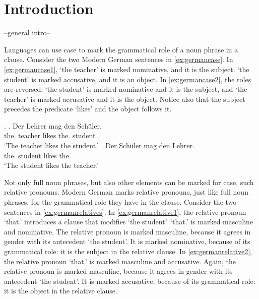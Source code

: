 
\chapter{Introduction}

--general intro--

Languages can use case to mark the grammatical role of a noun phrase in a clause. Consider the two Modern German sentences in \ref{ex:germancase}. In \ref{ex:germancase1},  `the teacher' is marked nominative, and it is the subject.  `the student' is marked accusative, and it is an object. In \ref{ex:germancase2}, the roles are reversed:  `the student' is marked nominative and it is the subject, and  `the teacher' is marked accusative and it is the object. Notice also that the subject precedes the predicate  `likes' and the object follows it.

\ex.\label{ex:germancase}
\ag. Der Lehrer mag den Schüler.\\
 the. teacher likes the. student\\
 `The teacher likes the student.'\label{ex:germancase1}
\bg. Der Schüler mag den Lehrer.\\
 the. student likes the.\\
 `The student likes the teacher.'\label{ex:germancase2}

Not only full noun phrases, but also other elements can be marked for case, such relative pronouns. Modern German marks relative pronouns, just like full noun phrases, for the grammatical role they have in the clause. Consider the two sentences in \ref{ex:germanrelatives}. In \ref{ex:germanrelative1}, the relative pronoun  `that.' introduces a clause that modifies  `the student'.  `that.' is marked masculine and nominative. The relative pronoun is marked masculine, because it agrees in gender with its antecedent  `the student'. It is marked nominative, because of its grammatical role: it is the subject in the relative clause.
In \ref{ex:germanrelative2}, the relative pronoun  `that.' is marked masculine and accusative. Again, the relative pronoun is marked masculine, because it agrees in gender with its antecedent  `the student'. It is marked accusative, because of its grammatical role: it is the object in the relative clause.

